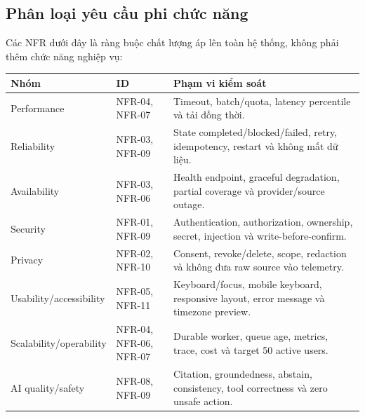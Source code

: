 \documentclass[12pt,a4paper]{article}
\begin{document}
\subsection{Phân loại yêu cầu phi chức năng}
Các NFR dưới đây là ràng buộc chất lượng áp lên toàn hệ thống, không phải thêm
chức năng nghiệp vụ:
\begin{longtable}{p{3.1cm}p{4.5cm}p{6.2cm}}
\toprule Nhóm & ID & Phạm vi kiểm soát \\ \midrule\endhead
Performance & NFR-04, NFR-07 & Timeout, batch/quota, latency percentile và tải đồng thời. \\
Reliability & NFR-03, NFR-09 & State completed/blocked/failed, retry, idempotency, restart và không mất dữ liệu. \\
Availability & NFR-03, NFR-06 & Health endpoint, graceful degradation, partial coverage và provider/source outage. \\
Security & NFR-01, NFR-09 & Authentication, authorization, ownership, secret, injection và write-before-confirm. \\
Privacy & NFR-02, NFR-10 & Consent, revoke/delete, scope, redaction và không đưa raw source vào telemetry. \\
Usability/accessibility & NFR-05, NFR-11 & Keyboard/focus, mobile keyboard, responsive layout, error message và timezone preview. \\
Scalability/operability & NFR-04, NFR-06, NFR-07 & Durable worker, queue age, metrics, trace, cost và target 50 active users. \\
AI quality/safety & NFR-08, NFR-09 & Citation, groundedness, abstain, consistency, tool correctness và zero unsafe action. \\
\bottomrule
\end{longtable}
\end{document}
